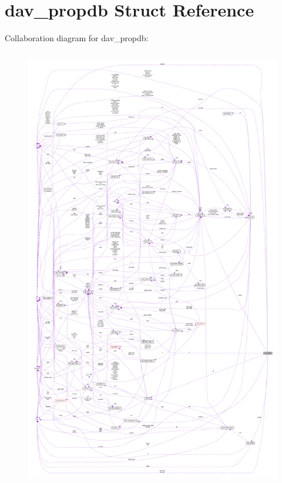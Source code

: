 \hypertarget{structdav__propdb}{}\section{dav\+\_\+propdb Struct Reference}
\label{structdav__propdb}


Collaboration diagram for dav\+\_\+propdb\+:
\nopagebreak
\begin{figure}[H]
\begin{center}
\leavevmode
\includegraphics[height=550pt]{structdav__propdb__coll__graph}
\end{center}
\end{figure}

